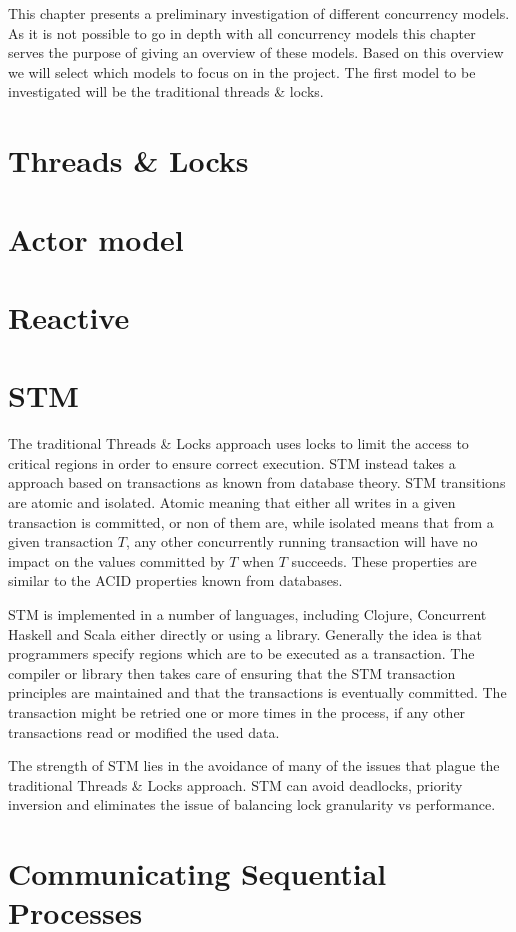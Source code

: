 \makeatletter {}\makeatother
{}
This chapter presents a preliminary investigation of different concurrency models. As it is not possible to go in depth with all concurrency models this chapter serves the purpose of giving an overview of these models. Based on this overview we will select which models to focus on in the project. The first model to be investigated will be the traditional threads \& locks.

\section{Threads \& Locks}
\section{Actor model}
\section{Reactive}
\section{\acl{STM}}
The traditional Threads \& Locks approach uses locks to limit the access to critical regions in order to ensure correct execution\cite[p. 1]{saha2006mcrt}. \ac{STM} instead takes a approach based on transactions as known from database theory\cite[p. 1]{shavit1997software}. \ac{STM} transitions are atomic and isolated. Atomic meaning that either all writes in a given transaction is committed, or non of them are, while isolated means that from a given transaction $T$, any other concurrently running transaction will have no impact on the values committed by $T$ when $T$ succeeds\cite[p. 102]{sevenModels}. These properties are similar to the ACID properties known from databases. 

\ac{STM} is implemented in a number of languages, including Clojure\cite[p. 101]{sevenModels}, Concurrent Haskell\cite{harris2005composable} and Scala\cite{goodman2011muts} either directly or using a library. Generally the idea is that programmers specify regions which are to be executed as a transaction. The compiler or library then takes care of ensuring that the \ac{STM} transaction principles are maintained and that the transactions is eventually committed\cite[p. 1]{saha2006mcrt}. The transaction might be retried one or more times in the process, if any other transactions read or modified the used data.

The strength of \ac{STM} lies in the avoidance of many of the issues that plague the traditional Threads \& Locks approach. \ac{STM} can avoid deadlocks, priority inversion and eliminates the issue of balancing lock granularity vs performance\cite[p. 1]{harris2005composable}.
\section{Communicating Sequential Processes}

\worksheetend
